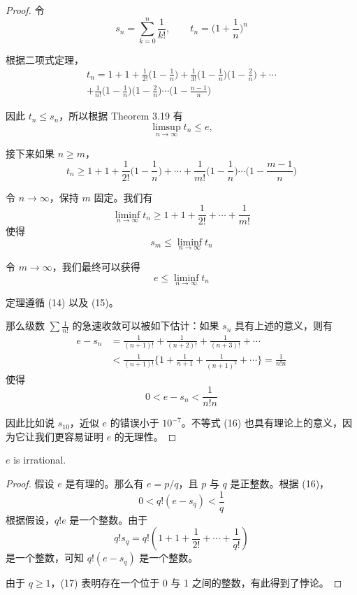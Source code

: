\documentclass[../poma-notes.tex]{subfiles}
\begin{document}
\begin{proof}
  令
  \[ s_n = \sum_{k=0}^{n} \frac{1}{k!}, \qquad t_n = \Biggl( 1 + \frac{1}{n} \Biggr)^n \]

  根据二项式定理，
  \begin{multline*}
    t_n = 1+1+\frac{1}{2!}\Biggl(1-\frac{1}{n}\Biggr)+\frac{1}{3!}\Biggl(1-\frac{1}{n}\Biggr)\Biggl(1-\frac{2}{n}\Biggr)+\cdots \\
    + \frac{1}{n!}\Biggl(1-\frac{1}{n}\Biggr)\Biggl(1-\frac{2}{n}\Biggr)\cdots\Biggl(1-\frac{n-1}{n}\Biggr)
  \end{multline*}

  因此 $t_n \le s_n$，所以根据 Theorem 3.19 有
  \begin{equation}
    \limsup_{n \to \infty} t_n \le e,
  \end{equation}

  接下来如果 $n \ge m$，
  \[
    t_n \ge 1 + 1 + \frac{1}{2!}\Biggl(1-\frac{1}{n}\Biggr) + \cdots
    + \frac{1}{m!}\Biggl(1-\frac{1}{n}\Biggr) \cdots \Biggl(1-\frac{m-1}{n}\Biggr)
  \]

  令 $n \to \infty$，保持 $m$ 固定。我们有
  \[ \liminf_{n \to \infty} t_n \ge 1 + 1 + \frac{1}{2!} + \cdots + \frac{1}{m!} \]
  使得
  \[ s_m \le \liminf_{n \to \infty} t_n \]

  令 $m \to \infty$，我们最终可以获得
  \begin{equation}
    e \le \liminf_{n \to \infty} t_n
  \end{equation}

  定理遵循 (14) 以及 (15)。

  那么级数 $\sum \frac{1}{n!}$ 的急速收敛可以被如下估计：如果 $s_n$ 具有上述的意义，则有
  \begin{align*}
    \mathcal{} e - s_n & = \frac{1}{(n+1)!} + \frac{1}{(n+2)!} + \frac{1}{(n+3)!} + \cdots                          \\
                       & < \frac{1}{(n+1)!}\Biggl\{1+\frac{1}{n+1}+\frac{1}{(n+1)^2}+\cdots\Biggr\} = \frac{1}{n!n}
  \end{align*}
  使得
  \begin{equation}
    0 < e - s_n < \frac{1}{n!n}
  \end{equation}

  因此比如说 $s_{10}$，近似 $e$ 的错误小于 $10^{-7}$。不等式 (16) 也具有理论上的意义，因为它让我们更容易证明 $e$ 的无理性。
\end{proof}


\begin{theorem}
  $e$ is irrational.
\end{theorem}

\begin{proof}
  假设 $e$ 是有理的。那么有 $e = p/q$，且 $p$ 与 $q$ 是正整数。根据 (16)，
  \begin{equation}
    0 < q!(e - s_q) < \frac{1}{q}
  \end{equation}
  根据假设，$q!e$ 是一个整数。由于
  \[ q!s_q = q!(1 + 1 + \frac{1}{2!} + \cdots + \frac{1}{q!}) \]
  是一个整数，可知 $q!(e-s_q)$ 是一个整数。

  由于 $q \ge 1$，(17) 表明存在一个位于 0 与 1 之间的整数，有此得到了悖论。
\end{proof}

\end{document}
